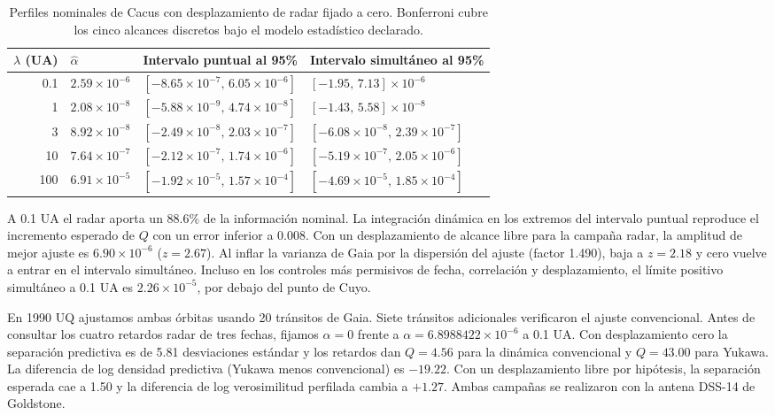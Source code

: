 \documentclass[11pt,a4paper]{article}
\begin{document}
\begin{table}[ht]
\centering
\small
\begin{tabular}{rlll}
\toprule
$\lambda$ (UA) & $\hat\alpha$ & Intervalo puntual al 95\% & Intervalo simultáneo al 95\% \\
\midrule
0.1 & $2.59\times10^{-6}$ & $[-8.65\times10^{-7},\,6.05\times10^{-6}]$ & $[-1.95,\,7.13]\times10^{-6}$ \\
1 & $2.08\times10^{-8}$ & $[-5.88\times10^{-9},\,4.74\times10^{-8}]$ & $[-1.43,\,5.58]\times10^{-8}$ \\
3 & $8.92\times10^{-8}$ & $[-2.49\times10^{-8},\,2.03\times10^{-7}]$ & $[-6.08\times10^{-8},\,2.39\times10^{-7}]$ \\
10 & $7.64\times10^{-7}$ & $[-2.12\times10^{-7},\,1.74\times10^{-6}]$ & $[-5.19\times10^{-7},\,2.05\times10^{-6}]$ \\
100 & $6.91\times10^{-5}$ & $[-1.92\times10^{-5},\,1.57\times10^{-4}]$ & $[-4.69\times10^{-5},\,1.85\times10^{-4}]$ \\
\bottomrule
\end{tabular}
\caption{Perfiles nominales de Cacus con desplazamiento de radar fijado a cero. Bonferroni cubre los cinco alcances discretos bajo el modelo estadístico declarado.}
\end{table}

A 0.1 UA el radar aporta un 88.6\% de la información nominal. La integración dinámica en los extremos del intervalo puntual reproduce el incremento esperado de $Q$ con un error inferior a 0.008. Con un desplazamiento de alcance libre para la campaña radar, la amplitud de mejor ajuste es $6.90\times10^{-6}$ ($z=2.67$). Al inflar la varianza de Gaia por la dispersión del ajuste (factor 1.490), baja a $z=2.18$ y cero vuelve a entrar en el intervalo simultáneo. Incluso en los controles más permisivos de fecha, correlación y desplazamiento, el límite positivo simultáneo a 0.1 UA es $2.26\times10^{-5}$, por debajo del punto de Cuyo.

En 1990 UQ ajustamos ambas órbitas usando 20 tránsitos de Gaia. Siete tránsitos adicionales verificaron el ajuste convencional. Antes de consultar los cuatro retardos radar de tres fechas, fijamos $\alpha=0$ frente a $\alpha=6.8988422\times10^{-6}$ a 0.1 UA. Con desplazamiento cero la separación predictiva es de 5.81 desviaciones estándar y los retardos dan $Q=4.56$ para la dinámica convencional y $Q=43.00$ para Yukawa. La diferencia de log densidad predictiva (Yukawa menos convencional) es $-19.22$. Con un desplazamiento libre por hipótesis, la separación esperada cae a 1.50 y la diferencia de log verosimilitud perfilada cambia a $+1.27$. Ambas campañas se realizaron con la antena DSS-14 de Goldstone.
\end{document}
